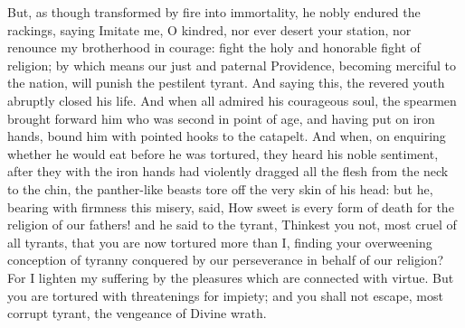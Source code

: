 {But, as though transformed by fire into immortality, he nobly endured the rackings, saying
Imitate me, O kindred, nor ever desert your station, nor renounce my brotherhood in courage: fight the holy and honorable fight of religion;
by which means our just and paternal Providence, becoming merciful to the nation, will punish the pestilent tyrant.
And saying this, the revered youth abruptly closed his life.
And when all admired his courageous soul, the spearmen brought forward him who was second in point of age, and having put on iron hands, bound him with pointed hooks to the catapelt.
And when, on enquiring whether he would eat before he was tortured, they heard his noble sentiment,
after they with the iron hands had violently dragged all the flesh from the neck to the chin, the panther-like beasts tore off the very skin of his head: but he, bearing with firmness this misery, said,
How sweet is every form of death for the religion of our fathers! and he said to the tyrant,
Thinkest you not, most cruel of all tyrants, that you are now tortured more than I, finding your overweening conception of tyranny conquered by our perseverance in behalf of our religion?
For I lighten my suffering by the pleasures which are connected with virtue.
But you are tortured with threatenings for impiety; and you shall not escape, most corrupt tyrant, the vengeance of Divine wrath.

}
